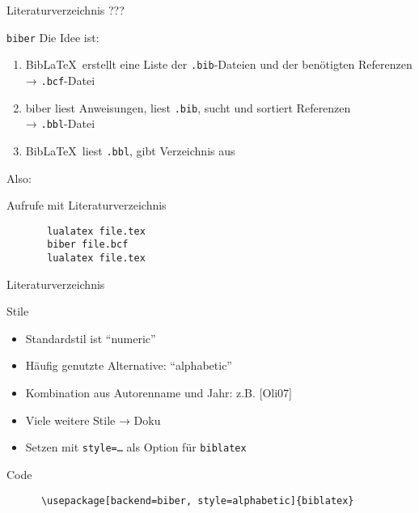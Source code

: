 \begin{frame}{Literaturverzeichnis}
  \centering
  \pause
  \Huge ???
\end{frame}

\begin{frame}[fragile]{\texttt{biber}}
  Die Idee ist:
  \begin{enumerate}
    \item Bib\LaTeX\ erstellt eine Liste der \texttt{.bib}-Dateien und der benötigten Referenzen \\
      → \texttt{.bcf}-Datei
    \item biber liest Anweisungen, liest \texttt{.bib}, sucht und sortiert Referenzen \\
      → \texttt{.bbl}-Datei
    \item Bib\LaTeX\ liest \texttt{.bbl}, gibt Verzeichnis aus
  \end{enumerate}

  \vspace{10pt}
  Also:
  \begin{tblock}{Aufrufe mit Literaturverzeichnis}
    \begin{lstlisting}
       lualatex file.tex
       biber file.bcf
       lualatex file.tex
    \end{lstlisting}
  \end{tblock}
\end{frame}

\begin{frame}{Literaturverzeichnis}
  \nocite{*}
  \printbibliography[heading=none]
\end{frame}

\begin{frame}[fragile]{Stile}
  \begin{itemize}
    \item Standardstil ist \enquote{numeric}
    \item Häufig genutzte Alternative: \enquote{alphabetic}
    \item Kombination aus Autorenname und Jahr: z.B. [Oli07]
    \item Viele weitere Stile → Doku
    \item Setzen mit \texttt{style=…} als Option für \texttt{biblatex}
  \end{itemize}
  \begin{tblock}{Code}
    \begin{lstlisting}
      \usepackage[backend=biber, style=alphabetic]{biblatex}
    \end{lstlisting}
  \end{tblock}
\end{frame}
